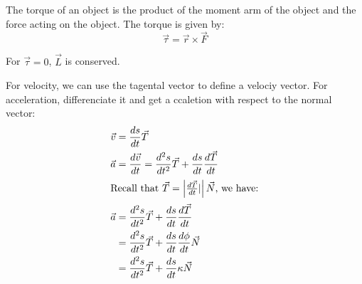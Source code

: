 \documentclass[11pt]{article}
\begin{document}
\begin{definition}[Torque]
    The torque of an object is the product of the moment arm of the object and the force acting on the object. The torque is given by:
    \begin{equation}
        \vec{\tau} = \vec{r} \times \vec{F}
    \end{equation}
\end{definition}
For $\vec{\tau} = 0$, $\vec{L}$ is conserved.
\begin{definition}[Acceleration]
    For velocity, we can use the tagental vector to define a velociy vector. For acceleration, differenciate it and get a ccaletion with respect to the normal vector:
    \begin{align}
        \vec{v} &= \frac{ds}{dt}\vec{T} \\
        \vec{a} &= \frac{d\vec{v}}{dt} = \frac{d^2s}{dt^2}\vec{T} + \frac{ds}{dt}\frac{d\vec{T}}{dt} \nonumber \\
        \intertext{Recall that $\vec{T} = \left | \frac{d\vec{T}}{dt} | \right | \vec{N}$, we have:}
        \vec{a} &= \frac{d^2s}{dt^2}\vec{T} + \frac{ds}{dt}\frac{d\vec{T}}{dt} \nonumber \\
        &= \frac{d^2s}{dt^2}\vec{T} + \frac{ds}{dt}\frac{d\phi}{dt}\vec{N} \nonumber \\
        &= \frac{d^2s}{dt^2}\vec{T} + \frac{ds}{dt}\kappa\vec{N}
    \end{align}
\end{definition}

\appendix

\end{document}
